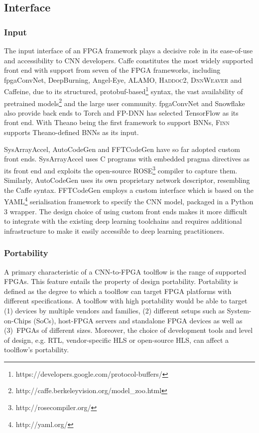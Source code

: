 \documentclass[format=acmsmall, review=false, screen=true]{acmart}
\begin{document}
\subsection{Interface}\label{sec4}
\subsubsection{Input}  \label{sec:inter_IN}
The input interface of an FPGA framework plays a decisive role in its ease-of-use and accessibility to CNN developers. Caffe constitutes the most widely supported front end with support from {\color{black}seven} of the FPGA frameworks, including fpgaConvNet, DeepBurning, Angel-Eye, ALAMO, {\color{black}\textsc{Haddoc2}}, \textsc{DnnWeaver} and Caffeine, due to its structured, protobuf-based\footnote{https://developers.google.com/protocol-buffers/} syntax, the vast availability of pretrained models\footnote{http://caffe.berkeleyvision.org/model\_zoo.html} and the large user community. %
fpgaConvNet {\color{black}and Snowflake} also provide back ends to Torch and FP-DNN has selected TensorFlow as its front end. %
With Theano being the first framework to support BNNs, \textsc{Finn} supports Theano-defined BNNs as its input.

SysArrayAccel, {\color{black}AutoCodeGen and FFTCodeGen} have so far adopted custom front ends. SysArrayAccel uses C programs with embedded pragma directives as its front end and exploits the open-source ROSE\footnote{http://rosecompiler.org/} compiler to capture them. {\color{black}Similarly, AutoCodeGen uses its own proprietary network descriptor, resembling the Caffe syntax. FFTCodeGen employs a custom interface which is based on the YAML\footnote{http://yaml.org/} serialisation framework to specify the CNN model, packaged in a Python 3 wrapper.} The design choice of using custom front ends makes it more difficult to integrate with the existing deep learning toolchains and requires additional infrastructure to make it easily accessible to deep learning practitioners.


\subsubsection{Portability}
A primary characteristic of a CNN-to-FPGA toolflow is the range of supported FPGAs. This feature entails the property of design portability. Portability is defined as the degree to which a toolflow can target FPGA platforms with different specifications. A toolflow with high portability would be able to target (1) devices by multiple vendors and families, (2) different setups such as System-on-Chips (SoCs), host-FPGA servers and standalone FPGA devices as well as \mbox{(3) FPGAs} of different sizes. Moreover, the choice of development tools and level of design, e.g. RTL, vendor-specific HLS or open-source HLS, can affect a toolflow's portability.
\end{document}
